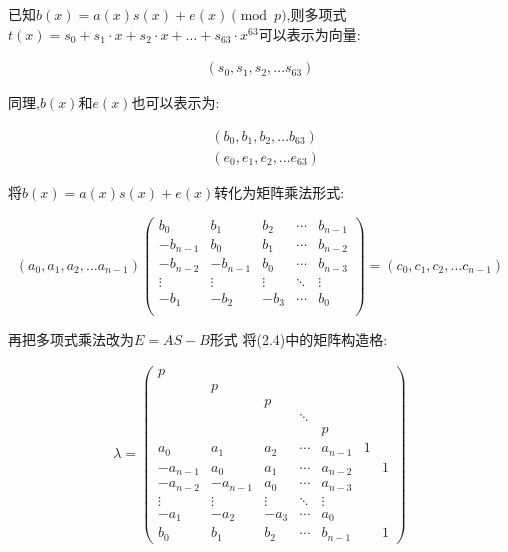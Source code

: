 \documentclass[12pt,a4paper]{article}
\numberwithin{equation}{section}
\begin{document}
已知$b(x)=a(x)s(x)+e(x) \pmod p$,则多项式$t(x)=s_0+s_1 \cdot x + s_2 \cdot x + \ldots + s_{63} \cdot x^{63}$可以表示为向量:

\begin{align}
	(s_0,s_1,s_2,...s_{63})
\end{align}

同理,$b(x)$和$e(x)$也可以表示为:

\begin{align}
	 & (b_0,b_1,b_2,...b_{63}) \\
	 & (e_0,e_1,e_2,...e_{63})
\end{align}

将$b(x)=a(x)s(x)+e(x)$转化为矩阵乘法形式:

\begin{equation}
	(a_0,a_1,a_2,...a_{n-1})
	\left(
	\begin{smallmatrix}
			b_0      & b_1      & b_2    & \cdots & b_{n-1} \\
			-b_{n-1} & b_0      & b_1    & \cdots & b_{n-2} \\
			-b_{n-2} & -b_{n-1} & b_0    & \cdots & b_{n-3} \\
			\vdots   & \vdots   & \vdots & \ddots & \vdots  \\
			-b_1     & -b_2     & -b_3   & \cdots & b_0     \\
		\end{smallmatrix}
	\right)
	=
	(c_0,c_1,c_2,...c_{n-1})
\end{equation}

再把多项式乘法改为$E=AS-B$形式
将(2.4)中的矩阵构造格:

\begin{align}
	\lambda=
	\left(
	\begin{smallmatrix}
		p        &          &        &        &         &   &   \\
		& p        &        &        &         &   &   \\
		&          & p      &        &         &   &   \\
		&          &        & \ddots &         &   &   \\
		&          &        &        & p       &   &   \\
		a_0      & a_1      & a_2    & \cdots & a_{n-1} & 1 &   \\
		-a_{n-1} & a_0      & a_1    & \cdots & a_{n-2} &   & 1 \\
		-a_{n-2} & -a_{n-1} & a_0    & \cdots & a_{n-3} &   &   \\
		\vdots   & \vdots   & \vdots & \ddots & \vdots  &   &   \\
		-a_1     & -a_2     & -a_3   & \cdots & a_0     &   &   \\
		b_0      & b_1      & b_2    & \cdots & b_{n-1} &   & 1
	\end{smallmatrix}
	\right)
\end{align}
\end{document}
